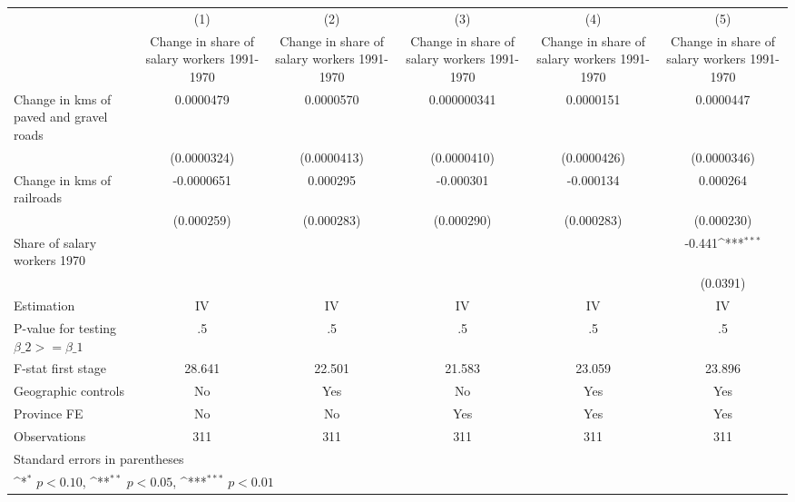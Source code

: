 {
\def\sym#1{\ifmmode^{#1}\else\(^{#1}\)\fi}
\begin{tabular}{l*{5}{c}}
\hline\hline
                    &\multicolumn{1}{c}{(1)}&\multicolumn{1}{c}{(2)}&\multicolumn{1}{c}{(3)}&\multicolumn{1}{c}{(4)}&\multicolumn{1}{c}{(5)}\\
                    &\multicolumn{1}{c}{Change in share of salary workers 1991-1970}&\multicolumn{1}{c}{Change in share of salary workers 1991-1970}&\multicolumn{1}{c}{Change in share of salary workers 1991-1970}&\multicolumn{1}{c}{Change in share of salary workers 1991-1970}&\multicolumn{1}{c}{Change in share of salary workers 1991-1970}\\
\hline
Change in kms of paved and gravel roads&   0.0000479         &   0.0000570         & 0.000000341         &   0.0000151         &   0.0000447         \\
                    & (0.0000324)         & (0.0000413)         & (0.0000410)         & (0.0000426)         & (0.0000346)         \\
[1em]
Change in kms of railroads&  -0.0000651         &    0.000295         &   -0.000301         &   -0.000134         &    0.000264         \\
                    &  (0.000259)         &  (0.000283)         &  (0.000290)         &  (0.000283)         &  (0.000230)         \\
[1em]
Share of salary workers 1970&                     &                     &                     &                     &      -0.441\sym{***}\\
                    &                     &                     &                     &                     &    (0.0391)         \\
\hline
Estimation          &          IV         &          IV         &          IV         &          IV         &          IV         \\
P-value for testing $\beta\_2 >= \beta\_1$&          .5         &          .5         &          .5         &          .5         &          .5         \\
F-stat first stage  &      28.641         &      22.501         &      21.583         &      23.059         &      23.896         \\
Geographic controls &          No         &         Yes         &          No         &         Yes         &         Yes         \\
Province FE         &          No         &          No         &         Yes         &         Yes         &         Yes         \\
Observations        &         311         &         311         &         311         &         311         &         311         \\
\hline\hline
\multicolumn{6}{l}{\footnotesize Standard errors in parentheses}\\
\multicolumn{6}{l}{\footnotesize \sym{*} \(p<0.10\), \sym{**} \(p<0.05\), \sym{***} \(p<0.01\)}\\
\end{tabular}
}
